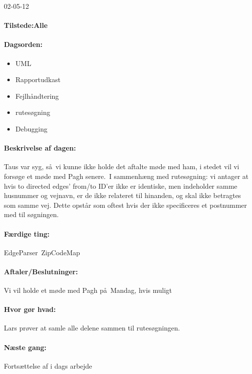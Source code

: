 \documentclass[a4paper,10pt,titlepage]{article}
\begin{document}
\begin{center}
		02-05-12
		\end{center}
		
		\paragraph{Tilstede:Alle}
		\paragraph{Dagsorden:}
		\begin{itemize}
					\item UML
					\item Rapportudkast
					\item Fejlh\aa ndtering
					\item rutes\o gning
					\item Debugging
		\end{itemize}
		
		\paragraph{Beskrivelse af dagen:}
		Taus var syg, s\aa \ vi kunne ikke holde det aftalte m\o de med ham, i stedet vil vi fors\o ge et m\o de med Pagh senere.\
		I sammenh\ae ng med rutes\o gning: vi antager at hvis to directed edges’ from/to ID’er ikke er identiske, men indeholder samme husnummer og vejnavn, er de ikke relateret til hinanden, og skal ikke betragtes som samme vej. Dette opst\aa r som oftest hvis der ikke specificeres et postnummer med til s\o gningen.
		\paragraph{F\ae rdige ting:}
		EdgeParser\
		ZipCodeMap
		\paragraph{Aftaler/Beslutninger:}
		Vi vil holde et m\o de med Pagh p\aa \ Mandag, hvis muligt
		\paragraph{Hvor g\o r hvad:}
		Lars pr\o ver at samle alle delene sammen til rutes\o gningen.
		\paragraph{N\ae ste gang:}
Forts\ae ttelse af i dags arbejde\mbox{}\\
\end{document}
